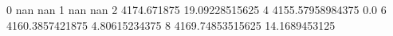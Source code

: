 0 nan nan
1 nan nan
2 4174.671875 19.09228515625
4 4155.57958984375 0.0
6 4160.3857421875 4.80615234375
8 4169.74853515625 14.1689453125

